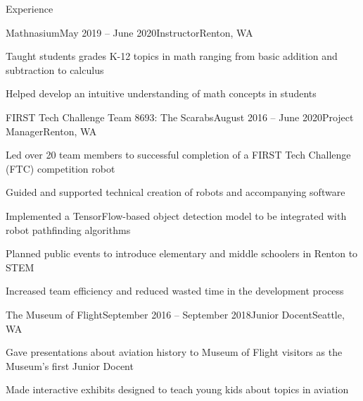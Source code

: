 \documentclass{resume} %
\begin{document}

\begin{rSection}{Experience}

\begin{rSubsection}{Mathnasium}{May 2019 – June 2020}{Instructor}{Renton, WA}
\item Taught students grades K-12 topics in math ranging from basic addition and subtraction to calculus
\item Helped develop an intuitive understanding of math concepts in students
\end{rSubsection}

\begin{rSubsection}{FIRST Tech Challenge Team 8693: The Scarabs}{August 2016 – June 2020}{Project Manager}{Renton, WA}
\item Led over 20 team members to successful completion of a FIRST Tech Challenge (FTC) competition robot
\item Guided and supported technical creation of robots and accompanying software
\item Implemented a TensorFlow-based object detection model to be integrated with robot pathfinding algorithms
\item Planned public events to introduce elementary and middle schoolers in Renton to STEM
\item Increased team efficiency and reduced wasted time in the development process
\end{rSubsection}

\begin{rSubsection}{The Museum of Flight}{September 2016 – September 2018}{Junior Docent}{Seattle, WA}
\item Gave presentations about aviation history to Museum of Flight visitors as the Museum's first Junior Docent
\item Made interactive exhibits designed to teach young kids about topics in aviation
\end{rSubsection}

\end{rSection}

\end{document}
